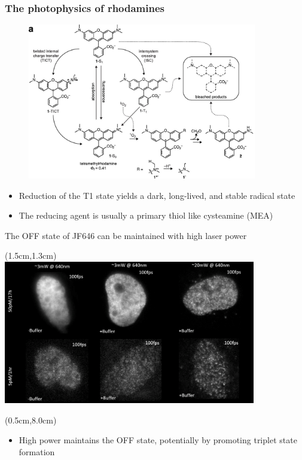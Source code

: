 \documentclass{beamer}					%
\begin{document}
\begin{frame}
\frametitle{The photophysics of rhodamines}

\begin{figure}
\includegraphics[width=10cm]{Rhodamines.png}
\end{figure}
\begin{itemize}
\item  Reduction of the T1 state yields a dark, long-lived, and stable radical state
\item The reducing agent is usually a primary thiol like cysteamine (MEA)
\end{itemize}
\end{frame}

\begin{frame}{The OFF state of JF646 can be maintained with high laser power}
\begin{textblock*}{11cm}(1.5cm,1.3cm)
\includegraphics[width=11cm]{Laser.png}
\end{textblock*}
\begin{textblock*}{\textwidth}(0.5cm,8.0cm)
\begin{itemize}
\item High power maintains the OFF state, potentially by promoting triplet state formation
\end{itemize}
\end{textblock*}
\end{frame}
\end{document}
